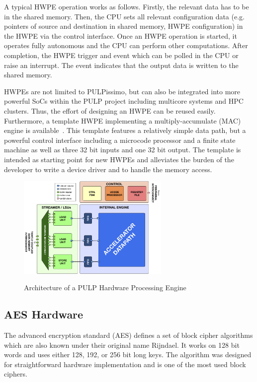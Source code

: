 \documentclass[a4paper, 12pt]{article}
\begin{document}
A typical HWPE operation works as follows. Firstly, the relevant data has to be in the shared memory. Then, the CPU sets all relevant configuration data (e.g. pointers of source and destination in shared memory, HWPE configuration) in the HWPE via the control interface. Once an HWPE operation is started, it operates fully autonomous and the CPU can perform other computations. After completion, the HWPE trigger and event which can be polled in the CPU or raise an interrupt. The event indicates that the output data is written to the shared memory.

HWPEs are not limited to PULPissimo, but can also be integrated into more powerful SoCs within the PULP project including multicore systems and HPC clusters. Thus, the effort of designing an HWPE can be reused easily. Furthermore, a template HWPE implementing a multiply-accumulate (MAC) engine is available~\cite{hwpe-mac}. This template features a relatively simple data path, but a powerful control interface including a microcode processor and a finite state machine as well as three 32 bit inputs and one 32 bit output. The template is intended as starting point for new HWPEs and alleviates the burden of the developer to write a device driver and to handle the memory access.

\begin{figure}
	\centering
	\includegraphics[width=0.65\textwidth]{hwpe.png}
	\label{hwpe-arch}
	\caption{Architecture of a PULP Hardware Processing Engine \cite{hwpe}}
\end{figure}

\subsection{AES Hardware}

The advanced encryption standard (AES) defines a set of block cipher algorithms which are also known under their original name Rijndael. It works on 128 bit words and uses either 128, 192, or 256 bit long keys. The algorithm was designed for straightforward hardware implementation and is one of the most used block ciphers.
\end{document}
